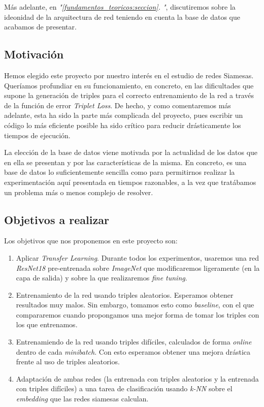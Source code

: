 \documentclass[11pt]{article}
\newcommand{\customcite}[1]{\emph{"\ref{#1}. \nameref{#1}"}}
\begin{document}
Más adelante, en \customcite{fundamentos_teoricos:seccion}, discutiremos sobre la ideonidad de la arquitectura de red teniendo en cuenta la base de datos que acabamos de presentar.

\subsection{Motivación}

Hemos elegido este proyecto por nuestro interés en el estudio de redes Siamesas. Queríamos profundiar en su funcionamiento, en concreto, en las dificultades que supone la generación de triples para el correcto entrenamiento de la red a través de la función de error \emph{Triplet Loss}. De hecho, y como comentaremos más adelante, esta ha sido la parte más complicada del proyecto, pues escribir un código lo más eficiente posible ha sido crítico para reducir drásticamente los tiempos de ejecución.

La elección de la base de datos viene motivada por la actualidad de los datos que en ella se presentan y por las características de la misma. En concreto, es una base de datos lo suficientemente sencilla como para permitirnos realizar la experimentación aquí presentada en tiempos razonables, a la vez que tratábamos un problema más o menos complejo de resolver.

\subsection{Objetivos a realizar}

Los objetivos que nos proponemos en este proyecto son: 

\begin{enumerate}
  \item Aplicar \emph{Transfer Learning}. Durante todos los experimentos, usaremos una red \emph{ResNet18} pre-entrenada sobre \emph{ImageNet} que modificaremos ligeramente (en la capa de salida) y sobre la que realizaremos \emph{fine tuning}.
  \item Entrenamiento de la red usando triples aleatorios. Esperamos obtener resultados muy malos. Sin embargo, tomamos esto como \emph{baseline}, con el que compararemos cuando propongamos una mejor forma de tomar los triples con los que entrenamos.
  \item Entrenamiendo de la red usando triples difíciles, calculados de forma \emph{online} dentro de cada \emph{minibatch}. Con esto esperamos obtener una mejora drástica frente al uso de triples aleatorios.
  \item Adaptación de ambas redes (la entrenada con triples aleatorios y la entrenada con triples difíciles) a una tarea de clasificación usando \emph{k-NN} sobre el \emph{embedding} que las redes siamesas calculan.
\end{enumerate}
\end{document}
